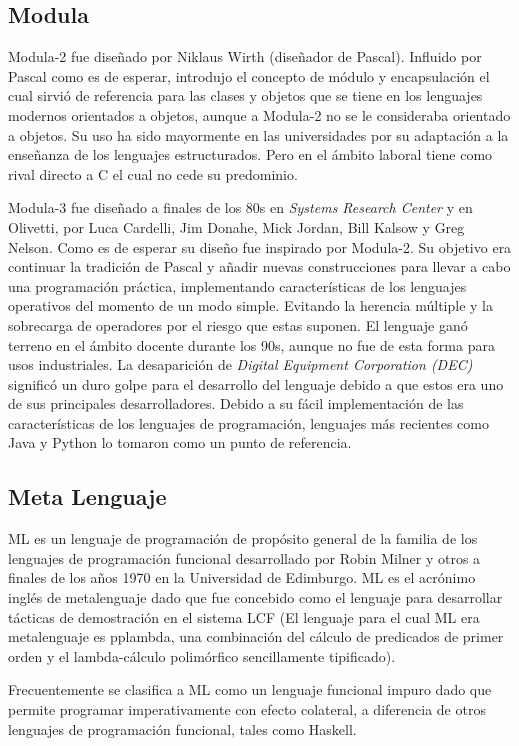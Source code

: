 \documentclass[twoside,twocolumn]{article}
\begin{document}
\subsection{Modula}
Modula-2 fue diseñado por Niklaus Wirth (diseñador de Pascal). Influido por Pascal como es de esperar, introdujo el concepto de módulo y encapsulación el cual sirvió de referencia para las clases y objetos que se tiene en los lenguajes modernos orientados a objetos, aunque a Modula-2 no se le consideraba orientado a objetos. Su uso ha sido mayormente en las universidades por su adaptación a la enseñanza de los lenguajes estructurados. Pero en el ámbito laboral tiene como rival directo a C el cual no cede su predominio.

Modula-3 fue diseñado a finales de los 80s en \textit{Systems Research Center} y en Olivetti, por Luca Cardelli, Jim Donahe, Mick Jordan, Bill Kalsow y Greg Nelson. Como es de esperar su diseño fue inspirado por Modula-2. Su objetivo era continuar la tradición de Pascal y añadir nuevas construcciones para llevar a cabo una programación práctica, implementando características de los lenguajes operativos del momento de un modo simple. Evitando la herencia múltiple y la sobrecarga de operadores por el riesgo que estas suponen. El lenguaje ganó terreno en el ámbito docente durante los 90s, aunque no fue de esta forma para usos industriales. La desaparición de \textit{Digital Equipment Corporation (DEC)} significó un duro golpe para el desarrollo del lenguaje debido a que estos era uno de sus principales desarrolladores. Debido a su fácil implementación de las características de los lenguajes de programación, lenguajes más recientes como Java y Python lo tomaron como un punto de referencia.


\subsection{Meta Lenguaje}

ML es un lenguaje de programación de propósito general de la familia de los lenguajes de programación funcional desarrollado por Robin Milner y otros a finales de los años 1970 en la Universidad de Edimburgo. ML es el acrónimo inglés de metalenguaje dado que fue concebido como el lenguaje para desarrollar tácticas de demostración en el sistema LCF (El lenguaje para el cual ML era metalenguaje es pplambda, una combinación del cálculo de predicados de primer orden y el lambda-cálculo polimórfico sencillamente tipificado).

Frecuentemente se clasifica a ML como un lenguaje funcional impuro dado que permite programar imperativamente con efecto colateral, a diferencia de otros lenguajes de programación funcional, tales como Haskell.
\end{document}
